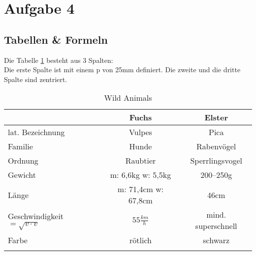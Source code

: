 \documentclass[a4paper, pdftex, ngerman, 11pt]{article}
\begin{document}
\section{Aufgabe 4}
\subsection{Tabellen \& Formeln}
Die Tabelle \ref{tab:ani} besteht aus 3 Spalten:\\
Die erste Spalte ist mit einem p von 25mm definiert. Die zweite und die dritte Spalte sind zentriert.

\begin{longtable}{p{25mm}|c|c}
& Fuchs & Elster\\
\hline
lat. Bezeichnung & Vulpes & Pica\\
\hline
Familie & Hunde & Rabenvögel\\
\hline
Ordnung & Raubtier & Sperrlingsvogel\\
\hline
Gewicht & m: 6,6kg w: 5,5kg & 200--250g\\
\hline
Länge  & m: 71,4cm w: 67,8cm & 46cm\\
\hline
Geschwindigkeit $ = \sqrt{v\cdot v}$ & $55\frac{km}{h}$ & mind. superschnell \\
\hline
Farbe & rötlich & schwarz\\
\hline
\caption{Wild Animals}
\label{tab:ani}
\end{longtable}
\end{document}
